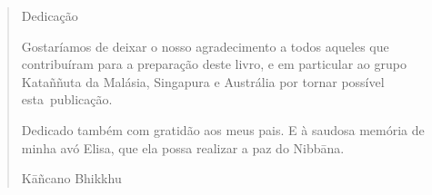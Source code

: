 \cleartorecto
\thispagestyle{empty}

\mbox{}\vfill

\begin{verse}
\centering
Dedicação

\bigskip

Gostaríamos de deixar o nosso agradecimento a todos aqueles que
contribuíram para a preparação deste livro, e em particular ao grupo
Kataññuta da Malásia, Singapura e Austrália por tornar possível esta~publicação.

\sectionBreak

Dedicado também com gratidão aos meus pais. E à
saudosa memória de minha avó Elisa, que ela possa realizar a
paz do Nibbāna.

Kāñcano Bhikkhu

\end{verse}

\vfill\mbox{}

